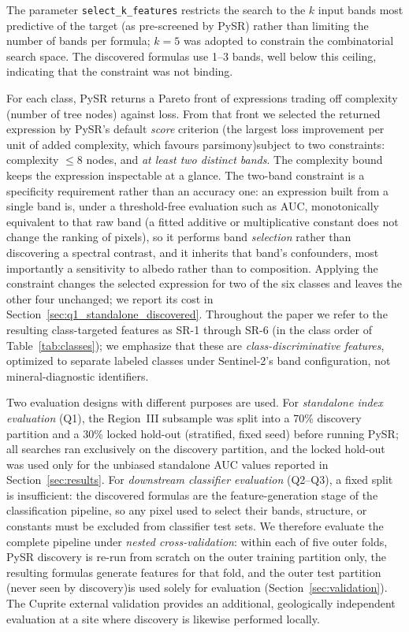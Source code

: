 \documentclass[preprint,authoryear,number]{elsarticle}
\begin{document}
The parameter \texttt{select\_k\_features} restricts the search to the $k$ input bands most predictive of the target (as pre-screened by PySR) rather than limiting the number of bands per formula; $k = 5$ was adopted to constrain the combinatorial search space. The discovered formulas use 1--3 bands, well below this ceiling, indicating that the constraint was not binding.

For each class, PySR returns a Pareto front of expressions trading off complexity (number of tree nodes) against loss. From that front we selected the returned expression by PySR's default \emph{score} criterion (the largest loss improvement per unit of added complexity, which favours parsimony)subject to two constraints: complexity $\leq 8$ nodes, and \emph{at least two distinct bands}. The complexity bound keeps the expression inspectable at a glance. The two-band constraint is a specificity requirement rather than an accuracy one: an expression built from a single band is, under a threshold-free evaluation such as AUC, monotonically equivalent to that raw band (a fitted additive or multiplicative constant does not change the ranking of pixels), so it performs band \emph{selection} rather than discovering a spectral contrast, and it inherits that band's confounders, most importantly a sensitivity to albedo rather than to composition. Applying the constraint changes the selected expression for two of the six classes and leaves the other four unchanged; we report its cost in Section~\ref{sec:q1_standalone_discovered}. Throughout the paper we refer to the resulting class-targeted features as SR-1 through SR-6 (in the class order of Table~\ref{tab:classes}); we emphasize that these are \emph{class-discriminative features}, optimized to separate labeled classes under Sentinel-2's band configuration, not mineral-diagnostic identifiers.

Two evaluation designs with different purposes are used. For \emph{standalone index evaluation} (Q1), the Region~III subsample was split into a 70\% discovery partition and a 30\% locked hold-out (stratified, fixed seed) before running PySR; all searches ran exclusively on the discovery partition, and the locked hold-out was used only for the unbiased standalone AUC values reported in Section~\ref{sec:results}. For \emph{downstream classifier evaluation} (Q2--Q3), a fixed split is insufficient: the discovered formulas are the feature-generation stage of the classification pipeline, so any pixel used to select their bands, structure, or constants must be excluded from classifier test sets. We therefore evaluate the complete pipeline under \emph{nested cross-validation}: within each of five outer folds, PySR discovery is re-run from scratch on the outer training partition only, the resulting formulas generate features for that fold, and the outer test partition (never seen by discovery)is used solely for evaluation (Section~\ref{sec:validation}). The Cuprite external validation provides an additional, geologically independent evaluation at a site where discovery is likewise performed locally.
\end{document}

